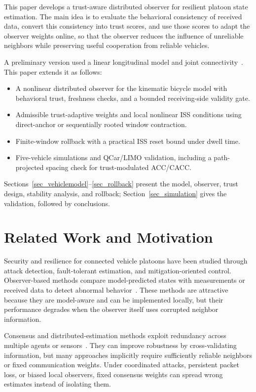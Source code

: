 \documentclass[letterpaper,journal]{IEEEtran}
\begin{document}
This paper develops a trust-aware distributed observer for resilient platoon state estimation. The main idea is to evaluate the behavioral consistency of received data, convert this consistency into trust scores, and use those scores to adapt the observer weights online, so that the observer reduces the influence of unreliable neighbors while preserving useful cooperation from reliable vehicles.

A preliminary version used a linear longitudinal model and joint connectivity~\cite{nguyen2026ifac}. This paper extends it as follows:
\begin{itemize}
    \item A nonlinear distributed observer for the kinematic bicycle model with behavioral trust, freshness checks, and a bounded receiving-side validity gate.
    \item Admissible trust-adaptive weights and local nonlinear ISS conditions using direct-anchor or sequentially rooted window contraction.
    \item Finite-window rollback with a practical ISS reset bound under dwell time.
    \item Five-vehicle simulations and QCar/LIMO validation, including a path-projected spacing check for trust-modulated ACC/CACC.
\end{itemize}

Sections~\ref{sec_vehiclemodel}--\ref{sec_rollback} present the model, observer, trust design, stability analysis, and rollback; Section~\ref{sec_simulation} gives the validation, followed by conclusions.

\section{Related Work and Motivation}\label{sec_related_work}
Security and resilience for connected vehicle platoons have been studied through attack detection, fault-tolerant estimation, and mitigation-oriented control. Observer-based methods compare model-predicted states with measurements or received data to detect abnormal behavior~\cite{jeon2020simultaneous,yamamoto2021attack,huang2022detection,2_obs_Angelo}. These methods are attractive because they are model-aware and can be implemented locally, but their performance degrades when the observer itself uses corrupted neighbor information.

Consensus and distributed-estimation methods exploit redundancy across multiple agents or sensors~\cite{Guitao_multi_mesure,Consensus_discret_Saber,Plug_play}. They can improve robustness by cross-validating information, but many approaches implicitly require sufficiently reliable neighbors or fixed communication weights. Under coordinated attacks, persistent packet loss, or biased local observers, fixed consensus weights can spread wrong estimates instead of isolating them.
\end{document}
